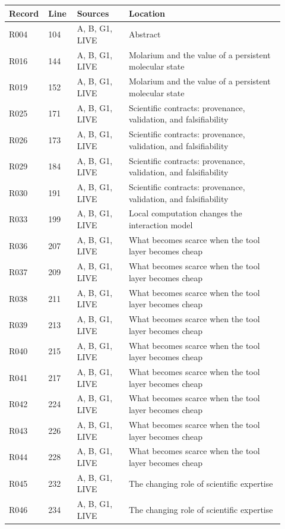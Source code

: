 \documentclass[11pt]{article}
\begin{document}
\begin{longtable}{@{}p{0.10\linewidth}p{0.10\linewidth}p{0.18\linewidth}p{0.54\linewidth}@{}}
\toprule Record & Line & Sources & Location\\\midrule\endhead
R004 & 104 & A, B, G1, LIVE & Abstract \\
R016 & 144 & A, B, G1, LIVE & Molarium and the value of a persistent molecular state \\
R019 & 152 & A, B, G1, LIVE & Molarium and the value of a persistent molecular state \\
R025 & 171 & A, B, G1, LIVE & Scientific contracts: provenance, validation, and falsifiability \\
R026 & 173 & A, B, G1, LIVE & Scientific contracts: provenance, validation, and falsifiability \\
R029 & 184 & A, B, G1, LIVE & Scientific contracts: provenance, validation, and falsifiability \\
R030 & 191 & A, B, G1, LIVE & Scientific contracts: provenance, validation, and falsifiability \\
R033 & 199 & A, B, G1, LIVE & Local computation changes the interaction model \\
R036 & 207 & A, B, G1, LIVE & What becomes scarce when the tool layer becomes cheap \\
R037 & 209 & A, B, G1, LIVE & What becomes scarce when the tool layer becomes cheap \\
R038 & 211 & A, B, G1, LIVE & What becomes scarce when the tool layer becomes cheap \\
R039 & 213 & A, B, G1, LIVE & What becomes scarce when the tool layer becomes cheap \\
R040 & 215 & A, B, G1, LIVE & What becomes scarce when the tool layer becomes cheap \\
R041 & 217 & A, B, G1, LIVE & What becomes scarce when the tool layer becomes cheap \\
R042 & 224 & A, B, G1, LIVE & What becomes scarce when the tool layer becomes cheap \\
R043 & 226 & A, B, G1, LIVE & What becomes scarce when the tool layer becomes cheap \\
R044 & 228 & A, B, G1, LIVE & What becomes scarce when the tool layer becomes cheap \\
R045 & 232 & A, B, G1, LIVE & The changing role of scientific expertise \\
R046 & 234 & A, B, G1, LIVE & The changing role of scientific expertise \\

\end{longtable}
\end{document}
